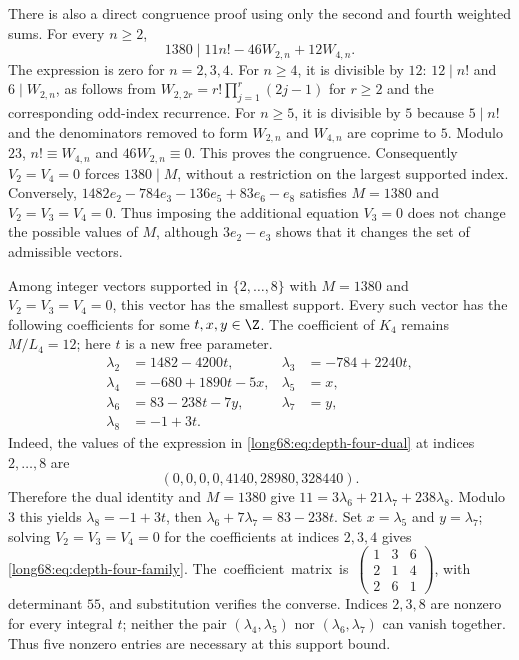There is also a direct congruence proof using only the second and
fourth weighted sums. For every $n\ge2$,
\begin{equation}
1380\mid 11n!-46W_{2,n}+12W_{4,n}.
\label{long68:eq:depth-four-dual}
\end{equation}
The expression is zero for $n=2,3,4$. For $n\ge4$, it is divisible
by $12$: $12\mid n!$ and $6\mid W_{2,n}$, as follows from
$W_{2,2r}=r!\prod_{j=1}^r(2j-1)$ for $r\ge2$ and the corresponding
odd-index recurrence. For $n\ge5$, it is divisible by $5$ because
$5\mid n!$ and the denominators removed to form $W_{2,n}$ and
$W_{4,n}$ are coprime to $5$. Modulo $23$,
$n!\equiv W_{4,n}$ and $46W_{2,n}\equiv0$. This proves the congruence.
Consequently $V_2=V_4=0$ forces $1380\mid M$, without a restriction
on the largest supported index. Conversely,
$1482e_2-784e_3-136e_5+83e_6-e_8$ satisfies $M=1380$ and
$V_2=V_3=V_4=0$. Thus imposing the additional equation $V_3=0$ does not change the
possible values of $M$, although $3e_2-e_3$ shows that it changes the set of
admissible vectors.

Among integer vectors supported in $\{2,\ldots,8\}$ with $M=1380$ and
$V_2=V_3=V_4=0$, this vector has the smallest support. Every such vector
has the following coefficients for some $t,x,y\in\Z$. The coefficient
of $K_4$ remains $M/L_4=12$; here $t$ is a new free parameter.
\begin{equation}
\begin{aligned}
\lambda_2&=1482-4200t,&\lambda_3&=-784+2240t,\\
\lambda_4&=-680+1890t-5x,&\lambda_5&=x,\\
\lambda_6&=83-238t-7y,&\lambda_7&=y,\\
\lambda_8&=-1+3t.
\end{aligned}
\label{long68:eq:depth-four-family}
\end{equation}
Indeed, the values of the expression in
\eqref{long68:eq:depth-four-dual} at indices $2,\ldots,8$ are
\[
(0,0,0,0,4140,28980,328440).
\]
Therefore the dual identity and
$M=1380$ give $11=3\lambda_6+21\lambda_7+238\lambda_8$.
Modulo $3$ this yields $\lambda_8=-1+3t$, then
$\lambda_6+7\lambda_7=83-238t$. Set $x=\lambda_5$ and
$y=\lambda_7$; solving $V_2=V_3=V_4=0$ for the coefficients at indices
$2,3,4$ gives \eqref{long68:eq:depth-four-family}. The~coefficient~matrix~is~$\left(\begin{smallmatrix}1&3&6\\2&1&4\\2&6&1\end{smallmatrix}\right)$,
with determinant $55$, and substitution verifies the converse.
Indices $2,3,8$ are nonzero for every integral $t$; neither the pair
$(\lambda_4,\lambda_5)$ nor $(\lambda_6,\lambda_7)$ can vanish
together. Thus five nonzero entries are necessary at this support bound.

